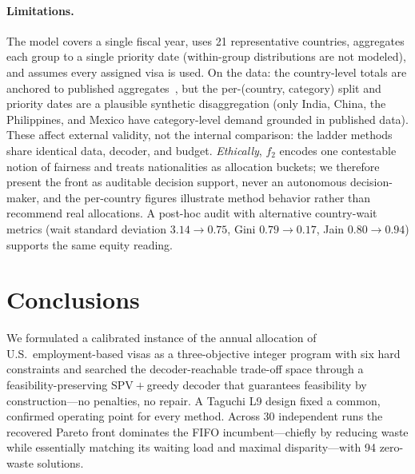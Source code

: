 \documentclass[runningheads]{llncs}
\begin{document}
\paragraph{Limitations.}
The model covers a single fiscal year, uses 21 representative countries, aggregates each group to a single priority date (within-group distributions are not modeled), and assumes every assigned visa is used. On the data: the country-level totals are anchored to published aggregates~\cite{cato,uscis,dos}, but the per-(country, category) split and priority dates are a plausible synthetic disaggregation (only India, China, the Philippines, and Mexico have category-level demand grounded in published data). These affect external validity, not the internal comparison: the ladder methods share identical data, decoder, and budget. \emph{Ethically}, $f_2$ encodes one contestable notion of fairness and treats nationalities as allocation buckets; we therefore present the front as auditable decision support, never an autonomous decision-maker, and the per-country figures illustrate method behavior rather than recommend real allocations. A post-hoc audit with alternative country-wait metrics (wait standard deviation $3.14\to0.75$, Gini $0.79\to0.17$, Jain $0.80\to0.94$) supports the same equity reading.

\section{Conclusions}
\label{sec:conclusions}

We formulated a calibrated instance of the annual allocation of U.S.\ employment-based visas as a three-objective integer program with six hard constraints and searched the decoder-reachable trade-off space through a feasibility-preserving SPV${}+{}$greedy decoder that guarantees feasibility by construction---no penalties, no repair. A Taguchi L9 design fixed a common, confirmed operating point for every method. Across 30 independent runs the recovered Pareto front dominates the FIFO incumbent---chiefly by reducing waste while essentially matching its waiting load and maximal disparity---with 94 zero-waste solutions.
\end{document}
